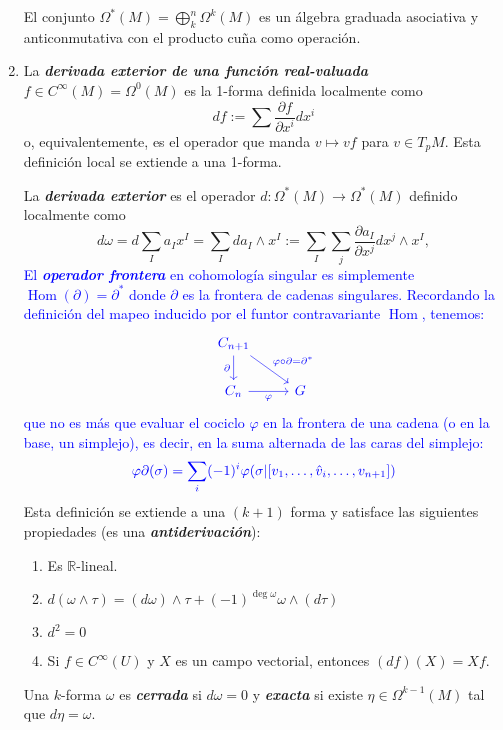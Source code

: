 \documentclass[spanish]{article}
\theoremstyle{definition}
\newcommand{\R}{\mathbb{R}}
\newcommand{\Cinf}{C^\infty}
\DeclareMathOperator{\Hom}{Hom}
\begin{document}
\begin{enumerate}
		El conjunto $\Omega^*(M)=\bigoplus_k^n\Omega^k(M)$ es un álgebra graduada asociativa y anticonmutativa con el producto cuña como operación.
		
		
		\item La \textbf{\textit{derivada exterior de una función real-valuada}} $f\in\Cinf(M)=\Omega^0(M)$ es la 1-forma definida localmente como
		\[df:=\sum\frac{\partial f}{\partial x^i}dx^i\]
		o, equivalentemente, es el operador que manda $v\mapsto vf$ para $v\in T_pM$. Esta definición local se extiende a una 1-forma.
		
		La \textbf{\textit{derivada exterior}} es el operador $d:\Omega^*(M)\to\Omega^*(M)$ definido localmente como
		\[d\omega=d\sum_Ia_Ix^I =\sum_Ida_I\wedge x^I:=\sum_I\sum_j\frac{\partial a_I}{\partial x^j}dx^j\wedge x^I,\]
		\textcolor{blue}{El \textbf{\textit{operador frontera}} en cohomología singular es simplemente $\Hom(\partial)=\partial^*$ donde $\partial$ es la frontera de cadenas singulares. Recordando la definición del mapeo inducido por el funtor contravariante $\Hom$, tenemos:}
		\[\begin{tikzcd}
			\textcolor{blue}{C_{n+1}}\arrow[d,blue,swap,"\partial"]\arrow[rd,blue,"\varphi\circ\partial=\partial^*"]\\	\textcolor{blue}{C_n}\arrow[blue,swap,r,"\varphi"]&\textcolor{blue}{G}
		\end{tikzcd}\]
		\textcolor{blue}{que no es más que evaluar el cociclo $\varphi$ en la frontera de una cadena (o en la base, un simplejo), es decir, en la suma alternada de las caras del simplejo:}
		\[\color{blue}\varphi\partial (\sigma)=\sum_i(-1)^i\varphi(\sigma|[v_1,\ldots,\hat{v}_i,\ldots,v_{n+1}])\]
		Esta definición se extiende a una $(k+1)$ forma y satisface las siguientes propiedades (es una \textbf{\textit{antiderivación}}):
		\begin{enumerate}
			\item Es $\R$-lineal.
			\item $d(\omega\wedge\tau)=(d\omega)\wedge\tau+(-1)^{\deg\omega}\omega\wedge(d\tau)$
			\item $d^2=0$
			\item Si $f\in\Cinf(U)$ y $X$ es un campo vectorial, entonces $(df)(X)=Xf$.
			
			
		\end{enumerate}
		Una $k$-forma $\omega$ es \textbf{\textit{cerrada}} si $d\omega=0$ y \textbf{\textit{exacta}} si existe $\eta\in\Omega^{k-1}(M)$ tal que $d\eta=\omega$.
		


\end{enumerate}
\end{document}
